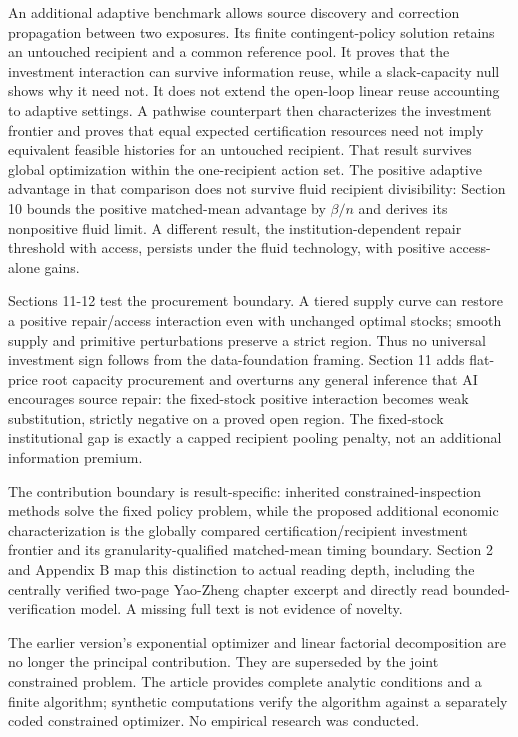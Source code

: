 \documentclass[
  11pt,
  a4paper,
]{article}
\begin{document}
An additional adaptive benchmark allows source discovery and correction
propagation between two exposures. Its finite contingent-policy solution
retains an untouched recipient and a common reference pool. It proves
that the investment interaction can survive information reuse, while a
slack-capacity null shows why it need not. It does not extend the
open-loop linear reuse accounting to adaptive settings. A pathwise
counterpart then characterizes the investment frontier and proves that
equal expected certification resources need not imply equivalent
feasible histories for an untouched recipient. That result survives
global optimization within the one-recipient action set. The positive
adaptive advantage in that comparison does not survive fluid recipient
divisibility: Section 10 bounds the positive matched-mean advantage by
\(\beta/n\) and derives its nonpositive fluid limit. A different result,
the institution-dependent repair threshold with access, persists under
the fluid technology, with positive access-alone gains.

Sections 11-12 test the procurement boundary. A tiered supply curve can
restore a positive repair/access interaction even with unchanged optimal
stocks; smooth supply and primitive perturbations preserve a strict
region. Thus no universal investment sign follows from the
data-foundation framing. Section 11 adds flat-price root capacity
procurement and overturns any general inference that AI encourages
source repair: the fixed-stock positive interaction becomes weak
substitution, strictly negative on a proved open region. The fixed-stock
institutional gap is exactly a capped recipient pooling penalty, not an
additional information premium.

The contribution boundary is result-specific: inherited
constrained-inspection methods solve the fixed policy problem, while the
proposed additional economic characterization is the globally compared
certification/recipient investment frontier and its
granularity-qualified matched-mean timing boundary. Section 2 and
Appendix B map this distinction to actual reading depth, including the
centrally verified two-page Yao-Zheng chapter excerpt and directly read
bounded-verification model. A missing full text is not evidence of
novelty.

The earlier version's exponential optimizer and linear factorial
decomposition are no longer the principal contribution. They are
superseded by the joint constrained problem. The article provides
complete analytic conditions and a finite algorithm; synthetic
computations verify the algorithm against a separately coded constrained
optimizer. No empirical research was conducted.
\end{document}
